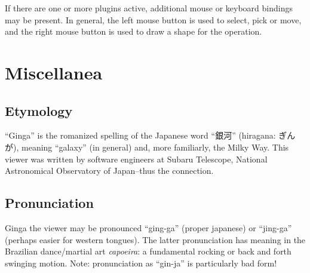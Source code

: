 \documentclass[11pt]{report}
\begin{document}
If there are one or more plugins active, additional mouse or keyboard
bindings may be present.  In general, the left mouse button is used to
select, pick or move, and the right mouse button is used to draw a
shape for the operation.  

\chapter{Miscellanea}
\section{Etymology}
``Ginga'' is the romanized spelling of the Japanese word ``銀河''
(hiragana: ぎんが), meaning ``galaxy'' (in general) and, more familiarly,
the Milky Way.  This viewer was written by software engineers at Subaru
Telescope, National Astronomical Observatory of Japan--thus the
connection. 

\section{Pronunciation}
Ginga the viewer may be pronounced ``ging-ga'' (proper japanese) or
``jing-ga'' (perhaps easier for western tongues).  The latter
pronunciation has meaning in the Brazilian dance/martial art
\emph{capoeira}: a fundamental rocking or back and forth swinging
motion.
Note: pronunciation as ``gin-ja'' is particularly bad form!
\end{document}
